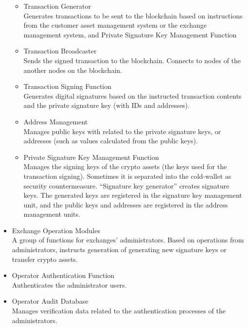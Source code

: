 \begin{itemize}
       \begin{itemize}
        \item Transaction Generator\\
              Generates transactions to be sent to the blockchain based on instructions from the customer asset management system or the exchange management system, and Private Signature Key Management Function
        \item Transaction Broadcaster\\
              Sends the signed transaction to the blockchain. Connects to nodes of the another nodes on the blockchain.
        \item Transaction Signing Function\\
              Generates digital signatures based on the instructed transaction contents and the private signature key (with IDs and addresses).
        \item Address Management\\
              Manages public keys with related to the private signature keys, or addresses (such as values calculated from the public keys).
        \item Private Signature Key Management Function\\
              Manages the signing keys of the crypto assets (the keys used for the transaction signing). Sometimes it is separated into the cold-wallet as security countermeasure. “Signature key generator” creates signature keys. The generated keys are registered in the signature key management unit, and the public keys and addresses are registered in the address management units.
       \end{itemize}
 \item Exchange Operation Modules\\
       A group of functions for exchanges’ administrators. Based on operations from administrators, instructs generation of generating new signature keys or transfer crypto assets.
 \item Operator Authentication Function\\
       Authenticates the administrator users.
 \item Operator Audit Database\\
       Manages verification data related to the authentication processes of the administrators.
\end{itemize}

